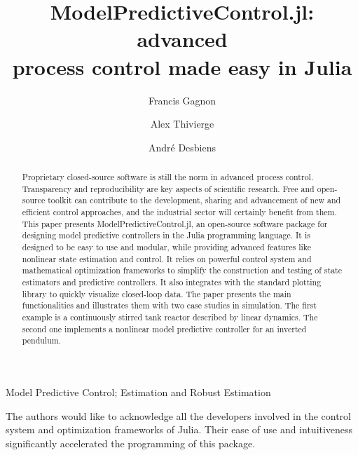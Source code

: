 \documentclass{ifacconf}
\begin{document}
\begin{frontmatter}

\title{ModelPredictiveControl.jl: advanced\\process control made easy in Julia}

\author[First]{Francis Gagnon} 
\author[First]{Alex Thivierge} 
\author[Second]{André Desbiens}

\address[First]{Jumine Inc., Quebec City, G1S 2K4, Canada}
\address[Second]{Process Observation and Optimization Laboratory (LOOP), Université Laval, Quebec City, G1V 0A6, Canada}

\begin{abstract} 
Proprietary closed-source software is still the norm in advanced process control. Transparency and reproducibility are key aspects of scientific research. Free and open-source toolkit can contribute to the development, sharing and advancement of  new and efficient control approaches, and the industrial sector will certainly benefit from them. This paper presents ModelPredictiveControl.jl, an open-source software package for designing model predictive controllers in the Julia programming language. It is designed to be easy to use and modular, while providing advanced features like nonlinear state estimation and control. It relies on powerful control system and mathematical optimization frameworks to simplify the construction and testing of state estimators and predictive controllers. It also integrates with the standard plotting library to quickly visualize closed-loop data. The paper presents the main functionalities and illustrates them with two case studies in simulation. The first example is a continuously stirred tank reactor described by linear dynamics. The second one implements a nonlinear model predictive controller for an inverted pendulum.
\end{abstract}

\begin{keyword}
Model Predictive Control; Estimation and Robust Estimation
\end{keyword}

\end{frontmatter}






\begin{ack}
The authors would like to acknowledge all the developers involved in the control system and optimization frameworks of Julia. Their ease of use and intuitiveness  significantly accelerated the programming of this package.
\end{ack}


\end{document}
